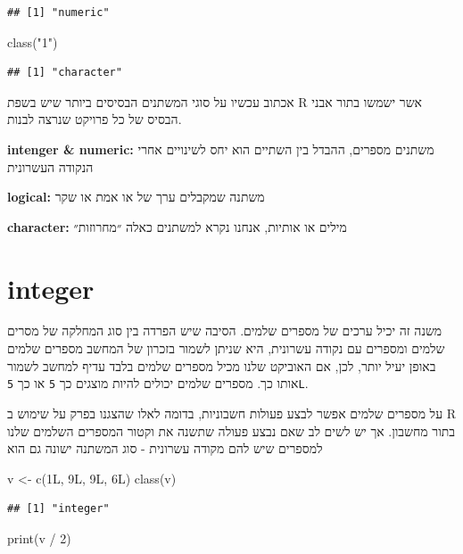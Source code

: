 \documentclass[
]{book}
\newenvironment{Shaded}{\begin{snugshade}}{\end{snugshade}}
\newcommand{\DecValTok}[1]{\textcolor[rgb]{0.00,0.00,0.81}{#1}}
\newcommand{\FunctionTok}[1]{\textcolor[rgb]{0.00,0.00,0.00}{#1}}
\newcommand{\NormalTok}[1]{#1}
\newcommand{\OtherTok}[1]{\textcolor[rgb]{0.56,0.35,0.01}{#1}}
\newcommand{\SpecialCharTok}[1]{\textcolor[rgb]{0.00,0.00,0.00}{#1}}
\newcommand{\StringTok}[1]{\textcolor[rgb]{0.31,0.60,0.02}{#1}}
\begin{document}
\begin{verbatim}
## [1] "numeric"
\end{verbatim}

\begin{Shaded}
\begin{Highlighting}[]
\FunctionTok{class}\NormalTok{(}\StringTok{"1"}\NormalTok{)}
\end{Highlighting}
\end{Shaded}

\begin{verbatim}
## [1] "character"
\end{verbatim}

אכתוב עכשיו על סוגי המשתנים הבסיסים ביותר שיש בשפת
R
אשר ישמשו בתור אבני הבסיס של כל פרויקט שנרצה לבנות.

\textbf{intenger \& numeric:} משתנים מספרים, ההבדל בין השתיים הוא יחס לשינויים אחרי הנקודה העשרונית

\textbf{logical:} משתנה שמקבלים ערך של או אמת או שקר

\textbf{character:} מילים או אותיות, אנחנו נקרא למשתנים כאלה ״מחרוזות״

\hypertarget{integer}{%
\section{integer}\label{integer}}

משנה זה יכיל ערכים של מספרים שלמים. הסיבה שיש הפרדה בין סוג המחלקה של מסרים שלמים ומספרים עם נקודה עשרונית, היא שניתן לשמור בזכרון של המחשב מספרים שלמים באופן יעיל יותר, לכן, אם האוביקט שלנו מכיל מספרים שלמים בלבד עדיף למחשב לשמור אותו כך. מספרים שלמים יכולים להיות מוצגים כך \texttt{5} או כך
\texttt{5L}.

על מספרים שלמים אפשר לבצע פעולות חשבוניות, בדומה לאלו שהצגנו בפרק על שימוש ב
R
בתור מחשבון.
אך יש לשים לב שאם נבצע פעולה שתשנה את וקטור המספרים השלמים שלנו למספרים שיש להם מקודה עשרונית - סוג המשתנה ישונה גם הוא

\begin{Shaded}
\begin{Highlighting}[]
\NormalTok{v }\OtherTok{\textless{}{-}} \FunctionTok{c}\NormalTok{(1L, 9L, 9L, 6L)}
\FunctionTok{class}\NormalTok{(v)}
\end{Highlighting}
\end{Shaded}

\begin{verbatim}
## [1] "integer"
\end{verbatim}

\begin{Shaded}
\begin{Highlighting}[]
\FunctionTok{print}\NormalTok{(v }\SpecialCharTok{/} \DecValTok{2}\NormalTok{)}
\end{Highlighting}
\end{Shaded}
\end{document}

